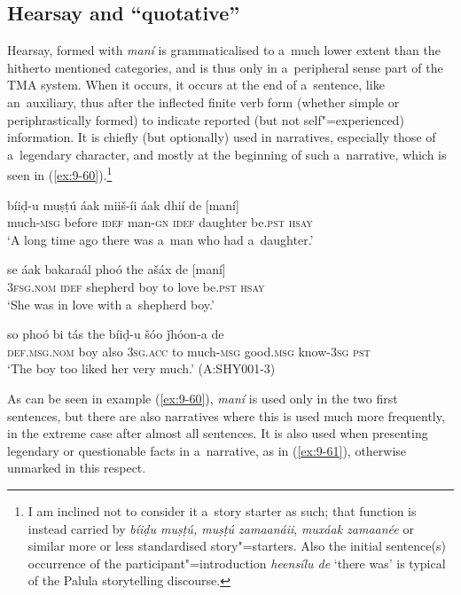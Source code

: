\subsection{Hearsay and ``quotative''}
\label{subsec:9-2-4}

Hearsay, formed with \textit{maní} is grammaticalised to a~much lower extent than the hitherto mentioned categories, and is thus only in a~peripheral sense part of the TMA system. When it occurs, it occurs at the end of a~sentence, like an~auxiliary, thus after the inflected finite verb form (whether simple or periphrastically formed) to indicate reported (but not self"=experienced) information. It is chiefly (but optionally) used in narratives, especially those of a~legendary character, and mostly at the beginning of such a~narrative, which is seen in (\ref{ex:9-60}).\footnote{I am inclined not to consider it a~story starter as such; that function is instead carried by \textit{bíiḍu muṣṭú, muṣṭú zamaanáii}, \textit{muxáak zamaanée} or similar more or less standardised story"=starters. Also the initial sentence(s) occurrence of the participant"=introduction \textit{heensílu de} `there was' is typical of the Palula storytelling discourse.} 

\begin{exe}
\ex
\label{ex:9-60}
\gll \label{bkm:Ref190746425}bíiḍ-u muṣṭú áak miiš-íi áak dhií de [maní] \\
much-\textsc{msg} before \textsc{idef} man-\textsc{gn} \textsc{idef} daughter be.\textsc{pst}
\textsc{hsay} \\
\glt `A long time ago there was a~man who had a~daughter.' 

\gll se áak bakaraál phoó the ašáx de [maní] \\
\textsc{3fsg.nom} \textsc{idef} shepherd boy to love be.\textsc{pst} \textsc{hsay} \\
\glt `She was in love with a~shepherd boy.'

\gll so phoó bi tás the bíiḍ-u  šóo ǰhóon-a de \\
\textsc{def.msg.nom} boy also \textsc{3sg.acc} to much-\textsc{msg}  good.\textsc{msg} know-\textsc{3sg} \textsc{pst} \\
\glt `The boy too liked her very much.' (A:SHY001-3)
\end{exe}

As can be seen in example (\ref{ex:9-60}), \textit{maní} is used only in the two first sentences, but there are also narratives where this is used much more frequently, in the extreme case after almost all sentences. It is also used when presenting legendary or questionable facts in a~narrative, as in (\ref{ex:9-61}), otherwise unmarked in this respect.

